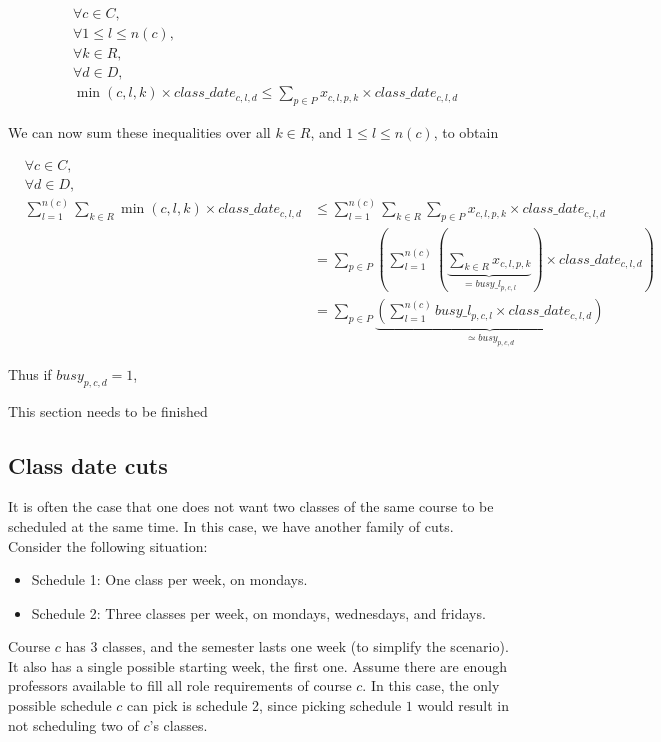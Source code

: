 \begin{align*}
&\forall c \in C,\\
&\forall 1 \le l \le n(c),\\
&\forall k \in R,\\
&\forall d \in D,\\
&\min(c, l, k)  \times class\_date_{c, l, d} \le \sum_{p \in P} x_{c, l, p, k} \times class\_date_{c, l, d}
\end{align*}

We can now sum these inequalities over all $k \in R$, and $1 \le l \le n(c)$, to obtain

\begin{align*}
&\forall c \in C,\\
&\forall d \in D,\\
&\sum_{l = 1}^{n(c)} \sum_{k \in R} \min(c, l, k) \times class\_date_{c, l, d} &\le \sum_{l = 1}^{n(c)} \sum_{k \in R} \sum_{p \in P} x_{c, l, p, k} \times class\_date_{c, l, d}\\
                                                  &&= \sum_{p \in P} \left(\sum_{l = 1}^{n(c)} \left(\underbrace{\sum_{k \in R} x_{c, l, p, k}}_{= busy\_l_{p, c, l}}\right) \times class\_date_{c, l, d} \right)\\
                                                  &&= \sum_{p \in P} \underbrace{\left(\sum_{l=1}^{n(c)} busy\_l_{p, c, l} \times class\_date_{c, l, d}\right)}_{\simeq busy_{p, c, d}}
\end{align*}

Thus if $busy_{p, c, d} = 1$,


{\color{red}This section needs to be finished}


\subsection{Class date cuts}

It is often the case that one does not want two classes of the same course to be scheduled at the same time. In this case, we have another family of cuts. Consider the following situation:

\begin{itemize}
  \item Schedule 1: One class per week, on mondays.
  \item Schedule 2: Three classes per week, on mondays, wednesdays, and fridays.
\end{itemize}

Course $c$ has 3 classes, and the semester lasts one week (to simplify the scenario). It also has a single possible starting week, the first one. Assume there are enough professors available to fill all role requirements of course $c$. In this case, the only possible schedule $c$ can pick is schedule 2, since picking schedule $1$ would result in not scheduling two of $c$'s classes.

